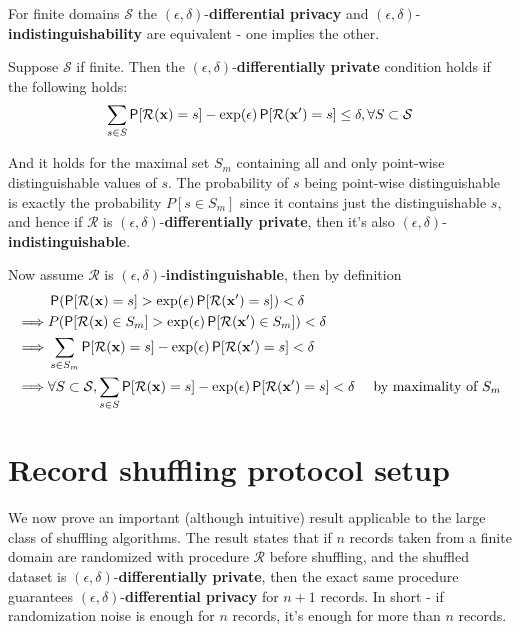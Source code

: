 \documentclass[11pt]{article}
\newcommand{\cR}{\mathcal{R}}
\newcommand{\Ssp}{\mathcal{S}}
\newcommand{\xv}{\mathbf{x}}
\begin{document}
\begin{prop} \label{prop:equavalent} For finite domains ${\Ssp}$ the $(\epsilon,\delta)$-\textbf{differential privacy} and  $(\epsilon,\delta)$-\textbf{indistinguishability} are equivalent - one implies the other. 

Suppose ${\Ssp}$  if finite.  Then the $(\epsilon,\delta)$-\textbf{differentially private} condition holds if the following holds:
\begin{align}\label{eq:diff}
\sum_{s \in S} \P[\cR(\xv) = s] -  \exp(\epsilon)  \P[\cR(\xv') = s] \le \delta , \forall S \cont \Ssp
\end{align}

And it holds for the maximal set $S_m$ containing all and only point-wise distinguishable values of $s$.  The probability of $s$ being point-wise distinguishable is exactly the probability $P[s \in S_m]$ since it contains just the distinguishable $s$, and hence if  $\cR$ is $(\epsilon,\delta)$-\textbf{differentially private}, then it's also $(\epsilon,\delta)$-\textbf{indistinguishable}.

Now assume $\cR$ is $(\epsilon,\delta)$-\textbf{indistinguishable}, then by definition
\begin{align*}
& \P( \P[\cR(\xv) = s] >  \exp(\epsilon) \P[\cR(\xv') = s] ) < \delta & \\
\implies & P( \P[\cR(\xv) \in S_m] >  \exp(\epsilon) \P[\cR(\xv') \in S_m]) < \delta & \\
\implies & \sum_{s \in S_m} \P[\cR(\xv) = s] -  \exp(\epsilon)  \P[\cR(\xv') = s] < \delta & \\
\implies & \forall S \cont \Ssp,  \sum_{s \in S} \P[\cR(\xv) = s] -  \exp(\epsilon)  \P[\cR(\xv') = s] < \delta  & \text{ by maximality of } S_m
\end{align*}
\end{prop}

\section{Record shuffling protocol setup}

We now prove an important (although intuitive) result applicable to the large class of shuffling algorithms.  The result states that if $n$ records taken from a finite domain are randomized with procedure $\cR$ before shuffling, and the shuffled dataset is $(\epsilon,\delta)$-\textbf{differentially private}, then the exact same procedure guarantees $(\epsilon,\delta)$-\textbf{differential privacy} for $n+1$ records. In short - if randomization noise is enough for $n$ records, it's enough for more than $n$ records.  
\end{document}
